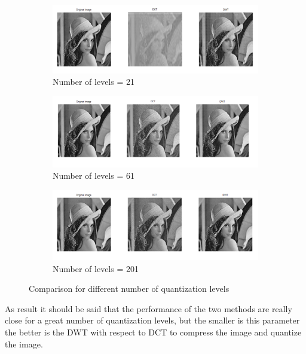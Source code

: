 \documentclass[a4paper, 10pt, conference] {article}
\begin{document}
 \begin{figure}[H]
 	\centering
 	\begin{subfigure}{1\textwidth} 
 		\centering						
 		\includegraphics[scale=0.35]{reportImages/comparison_level21.PNG}
 		\caption{Number of levels = 21}
 	\end{subfigure}
 	\begin{subfigure}{1\textwidth}
 		\centering
 		\includegraphics[scale=0.35]{reportImages/comparison_level61.PNG}
 		\caption{Number of levels = 61}
 	\end{subfigure}
 	\begin{subfigure}{1\textwidth}
 		\centering
 		\includegraphics[scale=0.35]{reportImages/comparison_level201.PNG}
 		\caption{Number of levels = 201}
 	\end{subfigure}
 	
 	\caption{Comparison for different number of quantization levels }
 	\label{Levels}
\end{figure}
As result it should be said that the performance of the two methods are really close for a great number of quantization levels, but the smaller is this parameter the better is the DWT with respect to DCT to compress the image and quantize the image.
 
\end{document}
